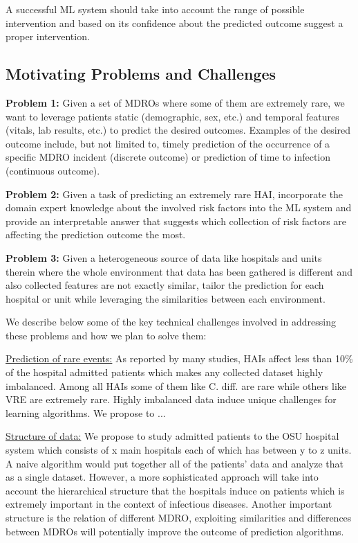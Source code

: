 A successful ML system should take into account the range of possible intervention and based on its confidence about the predicted outcome suggest a proper intervention.


\subsection{Motivating Problems and Challenges}
{\noindent \bf Problem 1:} Given a set of MDROs where some of them are extremely rare, we want to leverage patients static (demographic, sex, etc.) and temporal features (vitals, lab results, etc.) to predict the desired outcomes. Examples of the desired outcome include, but not limited to, timely prediction of the occurrence of a specific MDRO incident (discrete outcome) or prediction of time to infection (continuous outcome).

{\noindent \bf Problem 2:} Given a task of predicting an extremely rare HAI, incorporate the domain expert knowledge about the involved risk factors into the ML system and provide an interpretable answer that suggests which collection of risk factors are affecting the prediction outcome the most.

{\noindent \bf Problem 3:} Given a heterogeneous source of data like hospitals and units therein where the whole environment that data has been gathered is different and also collected features are not exactly similar, tailor the prediction for each hospital or unit while leveraging the similarities between each environment.

We describe below some of the key technical challenges involved in addressing these problems and how we plan to solve them:

\underline{Prediction of rare events:} As reported by many studies, HAIs affect less than 10\% of the hospital admitted patients which makes any collected dataset highly imbalanced. Among all HAIs some of them like C. diff. are rare while others like VRE are extremely rare. Highly imbalanced data induce unique challenges for learning algorithms. We propose to ...

\underline{Structure of data:} We propose to study admitted patients to the OSU hospital system which consists of x main hospitals each of which has between y to z units. A naive algorithm would put together all of the patients' data and analyze that as a single dataset. However, a more sophisticated approach will take into account the hierarchical structure that the hospitals induce on patients which is extremely important in the context of infectious diseases. Another important structure is the relation of different MDRO, exploiting similarities and differences between MDROs will potentially improve the outcome of prediction algorithms.


